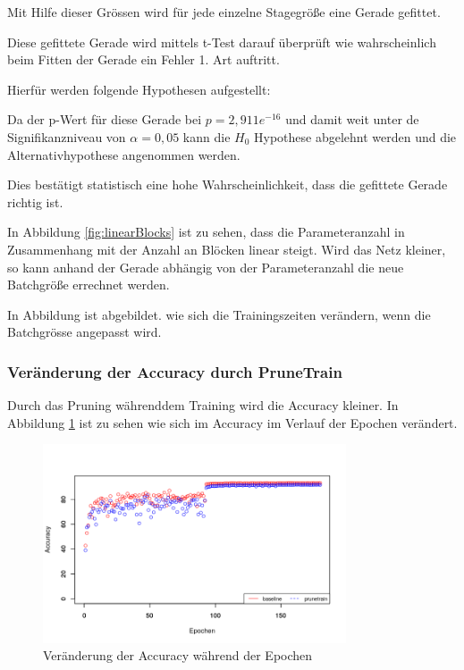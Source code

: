 Mit Hilfe dieser Grössen wird für jede einzelne Stagegröße eine Gerade gefittet.

Diese gefittete Gerade wird mittels t-Test darauf überprüft wie wahrscheinlich beim Fitten der Gerade ein Fehler 1. Art auftritt.

Hierfür werden folgende Hypothesen aufgestellt:


Da der p-Wert für diese Gerade bei $p=2,911e^{-16}$ und damit weit unter de Signifikanzniveau von $\alpha=0,05$ kann die $H_0$ Hypothese abgelehnt werden und die Alternativhypothese angenommen werden.

Dies bestätigt statistisch eine hohe Wahrscheinlichkeit, dass die gefittete Gerade richtig ist.



In Abbildung \ref{fig:linearBlocks} ist zu sehen, dass die Parameteranzahl in Zusammenhang mit der Anzahl an Blöcken linear steigt.
Wird das Netz kleiner, so kann anhand der Gerade abhängig von der Parameteranzahl die neue Batchgröße errechnet werden.







In Abbildung  ist abgebildet. wie sich die Trainingszeiten verändern, wenn die Batchgrösse angepasst wird.



\subsubsection{Veränderung der Accuracy durch PruneTrain}

Durch das Pruning währenddem Training wird die Accuracy kleiner. In Abbildung \ref{abb:PTaccuracy} ist zu sehen wie sich im Accuracy im Verlauf der Epochen verändert.  

\begin{figure}[h]
 \centering
 \includegraphics[width=0.8\textwidth]{KapitelPartB/Images/PTaccuracy.png}
 \caption{Veränderung der Accuracy während der Epochen}
 \label{abb:PTaccuracy}
\end{figure}

